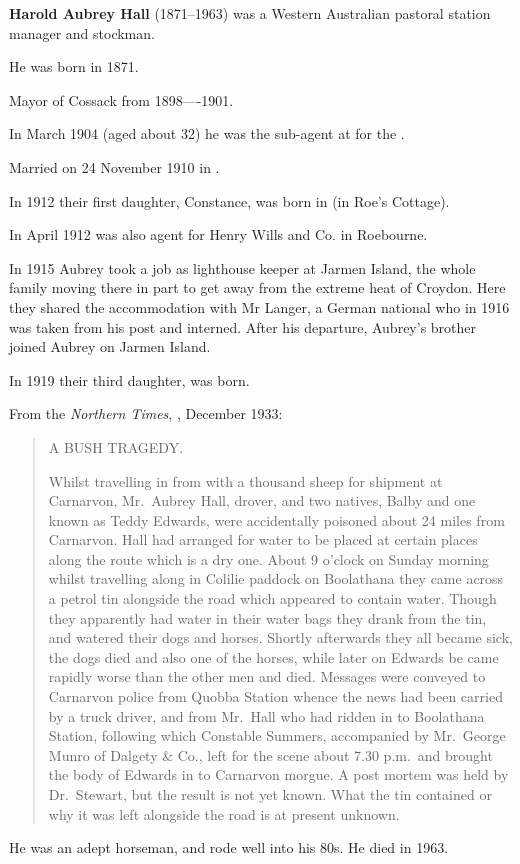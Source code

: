 
\textbf{Harold Aubrey Hall} (1871--1963) was a Western Australian pastoral station manager and stockman.

He was born in 1871.\cite{ADBWSHall}

Mayor of Cossack from 1898—-1901.\cite{CossackMayoralty}

In March 1904 (aged about 32) he was the sub-agent at  for the .\cite{1904AubreyAgent}

Married  on 24 November 1910 in .\cite{HAHmarriage,HallLodgeWedding}

In 1912 their first daughter, Constance, was born in  (in Roe's Cottage).\cite{Connie1966}

In April 1912 was also agent for Henry Wills and Co. in Roebourne.\cite{NorthernTimes1912}

In 1915 Aubrey took a job as lighthouse keeper at Jarmen Island,
the whole family moving there in part to get away from the extreme heat of Croydon.\cite{Connie1983}
Here they shared the accommodation with Mr Langer,
a German national who in 1916 was taken from his post and interned.\cite{Connie1983}
After his departure, Aubrey's brother  joined Aubrey on Jarmen Island.

In 1919 their third daughter,  was born.

From the \emph{Northern Times}, , December 1933:\cite{NorthernTimes1933}

\begin{quotation}
A BUSH TRAGEDY.

Whilst travelling in from  with a thousand sheep for shipment at Carnarvon,
Mr.\ Aubrey Hall, drover, and two natives, Balby and one known as Teddy Edwards,
were accidentally poisoned about 24 miles from Carnarvon.
Hall had arranged for water to be placed at certain places along the route which is a dry one.
About 9 o'clock on Sunday morning whilst travelling along in Colilie paddock on Boolathana
they came across a petrol tin alongside the road which appeared to contain water.
Though they apparently had water in their water bags they drank from the tin, and watered their dogs and horses.
Shortly afterwards they all became sick, the dogs died and also one of the horses,
while later on Edwards be came rapidly worse than the other men and died.
Messages were conveyed to Carnarvon police from Quobba Station whence the news had been carried by a truck driver,
and from Mr.\ Hall who had ridden in to Boolathana Station, following which Constable Summers,
accompanied by Mr.\ George Munro of Dalgety \& Co., left for the scene about 7.30 p.m.\ and
brought the body of Edwards in to Carnarvon morgue.
A post mortem was held by Dr.\ Stewart, but the result is not yet known.
What the tin contained or why it was left alongside the road is at present unknown.
\end{quotation}

He was an adept horseman, and rode well into his 80s. He died in 1963.
